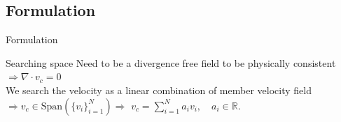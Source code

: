 \documentclass[aspectratio=169]{beamer} %
\begin{document}
\subsection{Formulation}
\begin{frame}{Formulation}

    \begin{block}{Searching space}
        Need to be a divergence free field to be physically consistent $\Rightarrow \nabla \cdot v_c = 0$ \\
        We search the velocity as a linear combination of member velocity field  \\
        $\Rightarrow v_c \in \mathrm{Span}\left(\{v_i\}_{i=1}^{N}\right) \Rightarrow$ $v_c = \sum_{i=1}^N a_i v_i, \quad a_i \in \mathbb{R}$.
    \end{block}

    \vfill
\end{frame}
\end{document}
